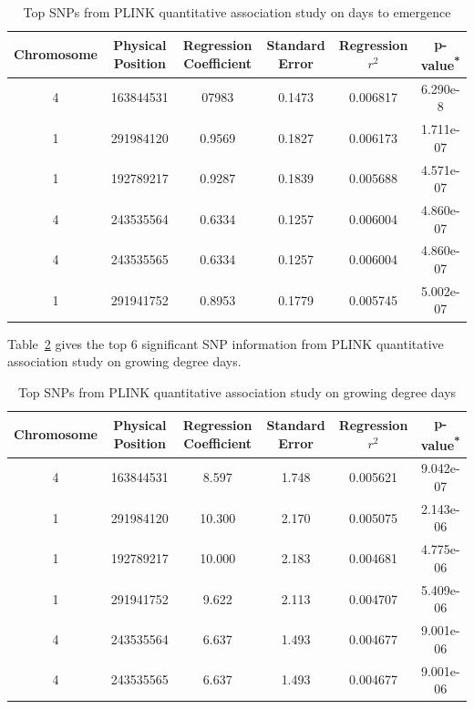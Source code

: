 \documentclass{article}
\begin{document}
\begin{table}[!h]
\centering
\begin{tabular}{|c|c|c|c|c|c|}
\hline
Chromosome & Physical Position & Regression Coefficient & Standard Error & Regression $r^2$ & p-value\textsuperscript{*} \\ [.5ex]
\hline
4 & 163844531 & 07983 & 0.1473 & 0.006817 & 6.290e-8 \\
\hline
1 & 291984120 & 0.9569 & 0.1827 & 0.006173 & 1.711e-07 \\
\hline
1 & 192789217 & 0.9287 & 0.1839 & 0.005688 & 4.571e-07 \\
\hline
4 & 243535564 & 0.6334 & 0.1257 & 0.006004 & 4.860e-07 \\
\hline
4 & 243535565 & 0.6334 & 0.1257 & 0.006004 & 4.860e-07 \\
\hline
1 & 291941752 & 0.8953 & 0.1779 & 0.005745 & 5.002e-07 \\
\hline
\end{tabular}
\caption{Top SNPs from PLINK quantitative association study on days to emergence}
\label{table:qassoc_dte}
\end{table}

Table~\ref{table:qassoc_gdd} gives the top 6 significant SNP information from PLINK quantitative association study on growing degree days.

\begin{table}[!h]
\centering
\begin{tabular}{|c|c|c|c|c|c|}
\hline
Chromosome & Physical Position & Regression Coefficient & Standard Error & Regression $r^2$ & p-value\textsuperscript{*} \\ [.5ex]
\hline
4 & 163844531 & 8.597 & 1.748 & 0.005621 & 9.042e-07 \\
\hline
1 & 291984120 & 10.300 & 2.170 & 0.005075 & 2.143e-06 \\
\hline
1 & 192789217 & 10.000 & 2.183 & 0.004681 & 4.775e-06 \\
\hline
1 & 291941752 & 9.622 & 2.113 & 0.004707 & 5.409e-06 \\
\hline
4 & 243535564 & 6.637 & 1.493 & 0.004677 & 9.001e-06 \\
\hline
4 & 243535565 & 6.637 & 1.493 & 0.004677 & 9.001e-06 \\
\hline
\end{tabular}
\caption{Top SNPs from PLINK quantitative association study on growing degree days}
\label{table:qassoc_gdd}
\end{table}
\end{document}
